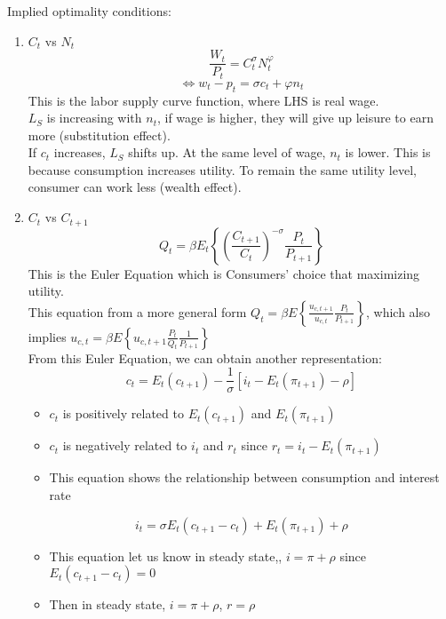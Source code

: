 \documentclass{article}
\begin{document}
Implied optimality conditions:
\begin{enumerate}
    \item $C_t$ vs $N_t$ 
    $$\frac{W_t}{P_t} = C_t^\sigma N_t^\varphi$$
    $$\Leftrightarrow w_t - p_t = \sigma c_t + \varphi n_t$$
    This is the labor supply curve function, where LHS is real wage.\\
    $L_S$ is increasing with $n_t$, if wage is higher, they will give up leisure to earn more (substitution effect).\\
    
    If $c_t$ increases, $L_S$ shifts up. At the same level of wage, $n_t$ is lower. This is because consumption increases utility. To remain the same utility level, consumer can work less (wealth effect).


    \item $C_t$ vs $C_{t+1}$
    $$Q_t = \beta E_t \left\{\left(\frac{C_{t+1}}{C_t}\right)^{-\sigma} \frac{P_t}{P_{t+1}} \right\}$$
    This is the Euler Equation which is Consumers' choice that maximizing utility.\\
    This equation from a more general form $Q_t = \beta E\left \{\frac{u_{c,t+1}}{u_{c,t}} \frac{P_t}{P_{t+1}}\right \}$, which also implies $u_{c,t} = \beta E\left\{u_{c,t+1} \frac{P_t}{Q_t} \frac{1}{P_{t+1}}\right\}$\\

    From this Euler Equation, we can obtain another representation:
    $$c_t = E_t(c_{t+1}) - \frac{1}{\sigma}\left[i_t - E_t(\pi_{t+1}) - \rho\right]$$
    \begin{itemize}
        \item $c_t$ is positively related to $E_t(c_{t+1})$ and $E_t(\pi_{t+1})$
        \item $c_t$ is negatively related to $i_t$ and $r_t$ since $r_t = i_t - E_t(\pi_{t+1})$
        \item This equation shows the relationship between consumption and interest rate
    \end{itemize}
    
    $$i_t = \sigma E_t(c_{t+1} - c_t) + E_t(\pi_{t+1}) + \rho$$
    \begin{itemize}
        \item This equation let us know in steady state,, $i = \pi + \rho$ since $E_t(c_{t+1} - c_t) = 0$
        \item Then in steady state, $i=\pi + \rho$, $r = \rho$\\
    \end{itemize}
    
\end{enumerate}
\end{document}

